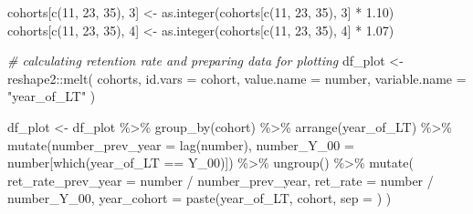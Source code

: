 \documentclass[
]{book}
\newenvironment{Shaded}{\begin{snugshade}}{\end{snugshade}}
\newcommand{\AttributeTok}[1]{\textcolor[rgb]{0.77,0.63,0.00}{#1}}
\newcommand{\CommentTok}[1]{\textcolor[rgb]{0.56,0.35,0.01}{\textit{#1}}}
\newcommand{\DecValTok}[1]{\textcolor[rgb]{0.00,0.00,0.81}{#1}}
\newcommand{\FloatTok}[1]{\textcolor[rgb]{0.00,0.00,0.81}{#1}}
\newcommand{\FunctionTok}[1]{\textcolor[rgb]{0.00,0.00,0.00}{#1}}
\newcommand{\NormalTok}[1]{#1}
\newcommand{\OtherTok}[1]{\textcolor[rgb]{0.56,0.35,0.01}{#1}}
\newcommand{\SpecialCharTok}[1]{\textcolor[rgb]{0.00,0.00,0.00}{#1}}
\newcommand{\StringTok}[1]{\textcolor[rgb]{0.31,0.60,0.02}{#1}}
\begin{document}
\begin{Shaded}
\begin{Highlighting}[]
\NormalTok{cohorts[}\FunctionTok{c}\NormalTok{(}\DecValTok{11}\NormalTok{, }\DecValTok{23}\NormalTok{, }\DecValTok{35}\NormalTok{), }\DecValTok{3}\NormalTok{] }\OtherTok{\textless{}{-}}
    \FunctionTok{as.integer}\NormalTok{(cohorts[}\FunctionTok{c}\NormalTok{(}\DecValTok{11}\NormalTok{, }\DecValTok{23}\NormalTok{, }\DecValTok{35}\NormalTok{), }\DecValTok{3}\NormalTok{] }\SpecialCharTok{*} \FloatTok{1.10}\NormalTok{)}
\NormalTok{cohorts[}\FunctionTok{c}\NormalTok{(}\DecValTok{11}\NormalTok{, }\DecValTok{23}\NormalTok{, }\DecValTok{35}\NormalTok{), }\DecValTok{4}\NormalTok{] }\OtherTok{\textless{}{-}}
    \FunctionTok{as.integer}\NormalTok{(cohorts[}\FunctionTok{c}\NormalTok{(}\DecValTok{11}\NormalTok{, }\DecValTok{23}\NormalTok{, }\DecValTok{35}\NormalTok{), }\DecValTok{4}\NormalTok{] }\SpecialCharTok{*} \FloatTok{1.07}\NormalTok{)}

\CommentTok{\# calculating retention rate and preparing data for plotting}
\NormalTok{df\_plot }\OtherTok{\textless{}{-}}
\NormalTok{    reshape2}\SpecialCharTok{::}\FunctionTok{melt}\NormalTok{(}
\NormalTok{        cohorts,}
        \AttributeTok{id.vars =} \StringTok{\textquotesingle{}cohort\textquotesingle{}}\NormalTok{,}
        \AttributeTok{value.name =} \StringTok{\textquotesingle{}number\textquotesingle{}}\NormalTok{,}
        \AttributeTok{variable.name =} \StringTok{"year\_of\_LT"}
\NormalTok{    )}

\NormalTok{df\_plot }\OtherTok{\textless{}{-}}\NormalTok{ df\_plot }\SpecialCharTok{\%\textgreater{}\%}
    \FunctionTok{group\_by}\NormalTok{(cohort) }\SpecialCharTok{\%\textgreater{}\%}
    \FunctionTok{arrange}\NormalTok{(year\_of\_LT) }\SpecialCharTok{\%\textgreater{}\%}
    \FunctionTok{mutate}\NormalTok{(}\AttributeTok{number\_prev\_year =} \FunctionTok{lag}\NormalTok{(number),}
           \AttributeTok{number\_Y\_00 =}\NormalTok{ number[}\FunctionTok{which}\NormalTok{(year\_of\_LT }\SpecialCharTok{==} \StringTok{\textquotesingle{}Y\_00\textquotesingle{}}\NormalTok{)]) }\SpecialCharTok{\%\textgreater{}\%}
    \FunctionTok{ungroup}\NormalTok{() }\SpecialCharTok{\%\textgreater{}\%}
    \FunctionTok{mutate}\NormalTok{(}
        \AttributeTok{ret\_rate\_prev\_year =}\NormalTok{ number }\SpecialCharTok{/}\NormalTok{ number\_prev\_year,}
        \AttributeTok{ret\_rate =}\NormalTok{ number }\SpecialCharTok{/}\NormalTok{ number\_Y\_00,}
        \AttributeTok{year\_cohort =} \FunctionTok{paste}\NormalTok{(year\_of\_LT, cohort, }\AttributeTok{sep =} \StringTok{\textquotesingle{}{-}\textquotesingle{}}\NormalTok{)}
\NormalTok{    )}


\end{Highlighting}
\end{Shaded}
\end{document}
